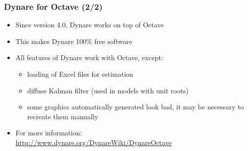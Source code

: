 \documentclass{beamer}
\begin{document}
\begin{frame}
  \frametitle{Dynare for Octave (2/2)}
  \begin{itemize}
  \item Since version 4.0, Dynare works on top of Octave
  \item This makes Dynare 100\% free software
  \item All features of Dynare work with Octave, except:
    \begin{itemize}
    \item loading of Excel files for estimation
    \item diffuse Kalman filter (used in models with unit roots)
    \item some graphics automatically generated look bad, it may be necessary to recreate them manually
    \end{itemize}
  \item For more information: \\
    \url{http://www.dynare.org/DynareWiki/DynareOctave}
  \end{itemize}
\end{frame}
\end{document}
